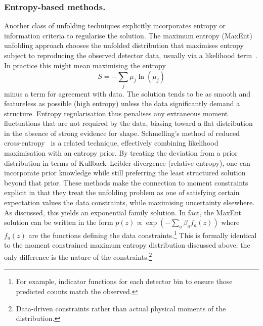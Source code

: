 {{        \subsubsection{Entropy-based methods.}
            Another class of unfolding techniques explicitly incorporates entropy or information criteria to regularise the solution.
            The maximum entropy (MaxEnt) unfolding approach chooses the unfolded distribution that maximises entropy subject to reproducing the observed detector data, usually via a likelihood term~\cite{Narayan:1986wj}.
            In practice this might mean maximising the entropy
            \[
                S = -\sum_j \mu_j \ln(\mu_j)
            \]
            minus a term for agreement with data.
            The solution tends to be as smooth and featureless as possible (high entropy) unless the data significantly demand a structure.
            Entropy regularisation thus penalises any extraneous moment fluctuations that are not required by the data, biasing toward a flat distribution in the absence of strong evidence for shape.
            Schmelling's method of reduced cross-entropy~\cite{Schmelling:1993cd} is a related technique, effectively combining likelihood maximisation with an entropy prior.
            By treating the deviation from a prior distribution in terms of Kullback--Leibler divergence (relative entropy), one can incorporate prior knowledge while still preferring the least structured solution beyond that prior.
            These methods make the connection to moment constraints explicit in that they treat the unfolding problem as one of satisfying certain expectation values the data constraints, while maximising uncertainty elsewhere.
            As discussed, this yields an exponential family solution.
            In fact, the MaxEnt solution can be written in the form $p(z) \propto \exp(-\sum_a \beta_a f_a(z))$ where $f_a(z)$ are the functions defining the data constraints.\footnote{For example, indicator functions for each detector bin to ensure those predicted counts match the observed.}
            This is formally identical to the moment constrained maximum entropy distribution discussed above; the only difference is the nature of the constraints.\footnote{Data-driven constraints rather than actual physical moments of the distribution.}
}}
